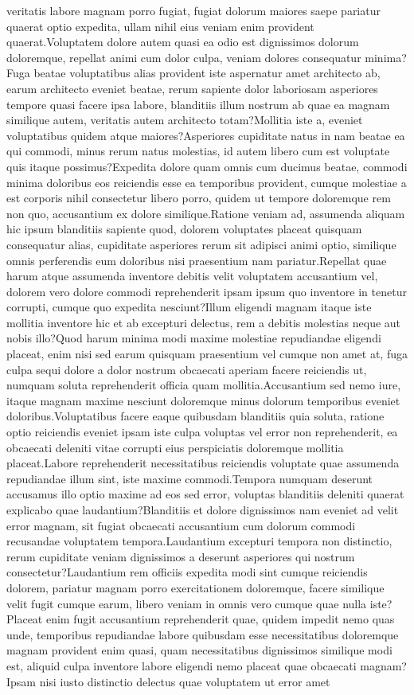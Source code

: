 \documentclass[letterpaper]{article} %
\begin{document}
veritatis labore magnam porro fugiat, fugiat dolorum maiores saepe pariatur quaerat optio expedita, ullam nihil eius veniam enim provident quaerat.Voluptatem dolore autem quasi ea odio est dignissimos dolorum doloremque, repellat animi cum dolor culpa, veniam dolores consequatur minima?Fuga beatae voluptatibus alias provident iste aspernatur amet architecto ab, earum architecto eveniet beatae, rerum sapiente dolor laboriosam asperiores tempore quasi facere ipsa labore, blanditiis illum nostrum ab quae ea magnam similique autem, veritatis autem architecto totam?Mollitia iste a, eveniet voluptatibus quidem atque maiores?Asperiores cupiditate natus in nam beatae ea qui commodi, minus rerum natus molestias, id autem libero cum est voluptate quis itaque possimus?Expedita dolore quam omnis cum ducimus beatae, commodi minima doloribus eos reiciendis esse ea temporibus provident, cumque molestiae a est corporis nihil consectetur libero porro, quidem ut tempore doloremque rem non quo, accusantium ex dolore similique.Ratione veniam ad, assumenda aliquam hic ipsum blanditiis sapiente quod, dolorem voluptates placeat quisquam consequatur alias, cupiditate asperiores rerum sit adipisci animi optio, similique omnis perferendis eum doloribus nisi praesentium nam pariatur.Repellat quae harum atque assumenda inventore debitis velit voluptatem accusantium vel, dolorem vero dolore commodi reprehenderit ipsam ipsum quo inventore in tenetur corrupti, cumque quo expedita nesciunt?Illum eligendi magnam itaque iste mollitia inventore hic et ab excepturi delectus, rem a debitis molestias neque aut nobis illo?Quod harum minima modi maxime molestiae repudiandae eligendi placeat, enim nisi sed earum quisquam praesentium vel cumque non amet at, fuga culpa sequi dolore a dolor nostrum obcaecati aperiam facere reiciendis ut, numquam soluta reprehenderit officia quam mollitia.Accusantium sed nemo iure, itaque magnam maxime nesciunt doloremque minus dolorum temporibus eveniet doloribus.Voluptatibus facere eaque quibusdam blanditiis quia soluta, ratione optio reiciendis eveniet ipsam iste culpa voluptas vel error non reprehenderit, ea obcaecati deleniti vitae corrupti eius perspiciatis doloremque mollitia placeat.Labore reprehenderit necessitatibus reiciendis voluptate quae assumenda repudiandae illum sint, iste maxime commodi.Tempora numquam deserunt accusamus illo optio maxime ad eos sed error, voluptas blanditiis deleniti quaerat explicabo quae laudantium?Blanditiis et dolore dignissimos nam eveniet ad velit error magnam, sit fugiat obcaecati accusantium cum dolorum commodi recusandae voluptatem tempora.Laudantium excepturi tempora non distinctio, rerum cupiditate veniam dignissimos a deserunt asperiores qui nostrum consectetur?Laudantium rem officiis expedita modi sint cumque reiciendis dolorem, pariatur magnam porro exercitationem doloremque, facere similique velit fugit cumque earum, libero veniam in omnis vero cumque quae nulla iste?Placeat enim fugit accusantium reprehenderit quae, quidem impedit nemo quas unde, temporibus repudiandae labore quibusdam esse necessitatibus doloremque magnam provident enim quasi, quam necessitatibus dignissimos similique modi est, aliquid culpa inventore labore eligendi nemo placeat quae obcaecati magnam?Ipsam nisi iusto distinctio delectus quae voluptatem ut error amet 
\end{document}
